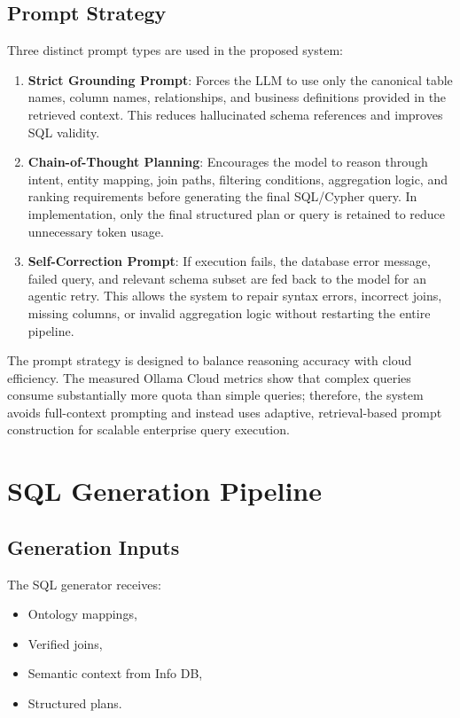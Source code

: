 \documentclass[11pt,a4paper]{article}
\begin{document}
\subsection{Prompt Strategy}

Three distinct prompt types are used in the proposed system:

\begin{enumerate}
    \item \textbf{Strict Grounding Prompt}: Forces the LLM to use only the canonical table names, column names, relationships, and business definitions provided in the retrieved context. This reduces hallucinated schema references and improves SQL validity.
    
    \item \textbf{Chain-of-Thought Planning}: Encourages the model to reason through intent, entity mapping, join paths, filtering conditions, aggregation logic, and ranking requirements before generating the final SQL/Cypher query. In implementation, only the final structured plan or query is retained to reduce unnecessary token usage.
    
    \item \textbf{Self-Correction Prompt}: If execution fails, the database error message, failed query, and relevant schema subset are fed back to the model for an agentic retry. This allows the system to repair syntax errors, incorrect joins, missing columns, or invalid aggregation logic without restarting the entire pipeline.
\end{enumerate}

The prompt strategy is designed to balance reasoning accuracy with cloud efficiency. The measured Ollama Cloud metrics show that complex queries consume substantially more quota than simple queries; therefore, the system avoids full-context prompting and instead uses adaptive, retrieval-based prompt construction for scalable enterprise query execution.
\section{SQL Generation Pipeline}

\subsection{Generation Inputs}

The SQL generator receives:
\begin{itemize}
    \item Ontology mappings,
    \item Verified joins,
    \item Semantic context from Info DB,
    \item Structured plans.
\end{itemize}
\end{document}
